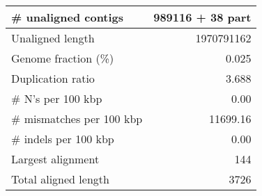 \documentclass[12pt,a4paper]{article}
\begin{document}
\begin{table}[ht]
\begin{center}
\begin{tabular}{|l*{1}{|r}|}
\# unaligned contigs & 989116 + 38 part \\ \hline
Unaligned length & 1970791162 \\ \hline
Genome fraction (\%) & 0.025 \\ \hline
Duplication ratio & 3.688 \\ \hline
\# N's per 100 kbp & 0.00 \\ \hline
\# mismatches per 100 kbp & 11699.16 \\ \hline
\# indels per 100 kbp & 0.00 \\ \hline
Largest alignment & 144 \\ \hline
Total aligned length & 3726 \\ \hline
\end{tabular}
\end{center}
\end{table}
\end{document}
